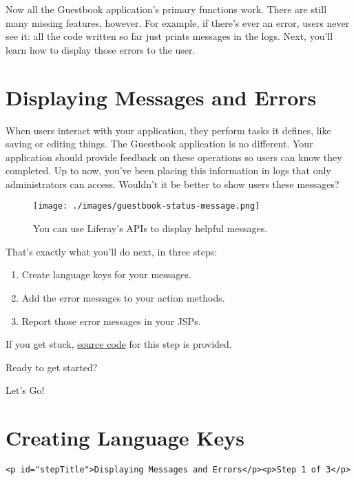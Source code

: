 \noindent\hrulefill

Now all the Guestbook application's primary functions work. There are
still many missing features, however. For example, if there's ever an
error, users never see it: all the code written so far just prints
messages in the logs. Next, you'll learn how to display those errors to
the user.

\chapter{Displaying Messages and
Errors}\label{displaying-messages-and-errors}

When users interact with your application, they perform tasks it
defines, like saving or editing things. The Guestbook application is no
different. Your application should provide feedback on these operations
so users can know they completed. Up to now, you've been placing this
information in logs that only administrators can access. Wouldn't it be
better to show users these messages?

\begin{figure}
\centering
\texttt{[image: ./images/guestbook-status-message.png]}
\caption{You can use Liferay's APIs to display helpful messages.}
\end{figure}

That's exactly what you'll do next, in three steps:

\begin{enumerate}
\def\labelenumi{\arabic{enumi}.}
\tightlist
\item
  Create language keys for your messages.
\item
  Add the error messages to your action methods.
\item
  Report those error messages in your JSPs.
\end{enumerate}

If you get stuck,
\href{https://github.com/liferay/liferay-docs/tree/master/en/developer/tutorials/code/guestbook/06-messages/com-liferay-docs-guestbook}{source
code} for this step is provided.

Ready to get started?

Let's Go!{}

\chapter{Creating Language Keys}\label{creating-language-keys}

\begin{verbatim}
<p id="stepTitle">Displaying Messages and Errors</p><p>Step 1 of 3</p>
\end{verbatim}

